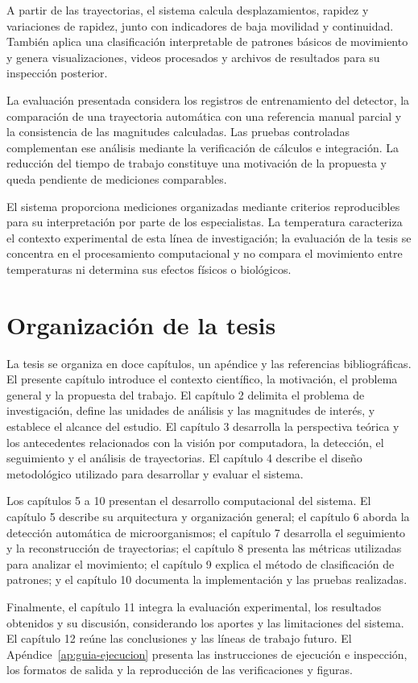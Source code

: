 A partir de las trayectorias, el sistema calcula desplazamientos, rapidez y variaciones de rapidez, junto con indicadores de baja movilidad y continuidad. También aplica una clasificación interpretable de patrones básicos de movimiento y genera visualizaciones, videos procesados y archivos de resultados para su inspección posterior.

La evaluación presentada considera los registros de entrenamiento del detector, la comparación de una trayectoria automática con una referencia manual parcial y la consistencia de las magnitudes calculadas. Las pruebas controladas complementan ese análisis mediante la verificación de cálculos e integración. La reducción del tiempo de trabajo constituye una motivación de la propuesta y queda pendiente de mediciones comparables.

El sistema proporciona mediciones organizadas mediante criterios reproducibles para su interpretación por parte de los especialistas. La temperatura caracteriza el contexto experimental de esta línea de investigación; la evaluación de la tesis se concentra en el procesamiento computacional y no compara el movimiento entre temperaturas ni determina sus efectos físicos o biológicos.

\section{Organización de la tesis}

La tesis se organiza en doce capítulos, un apéndice y las referencias bibliográficas. El presente capítulo introduce el contexto científico, la motivación, el problema general y la propuesta del trabajo. El capítulo 2 delimita el problema de investigación, define las unidades de análisis y las magnitudes de interés, y establece el alcance del estudio. El capítulo 3 desarrolla la perspectiva teórica y los antecedentes relacionados con la visión por computadora, la detección, el seguimiento y el análisis de trayectorias. El capítulo 4 describe el diseño metodológico utilizado para desarrollar y evaluar el sistema.

Los capítulos 5 a 10 presentan el desarrollo computacional del sistema. El capítulo 5 describe su arquitectura y organización general; el capítulo 6 aborda la detección automática de microorganismos; el capítulo 7 desarrolla el seguimiento y la reconstrucción de trayectorias; el capítulo 8 presenta las métricas utilizadas para analizar el movimiento; el capítulo 9 explica el método de clasificación de patrones; y el capítulo 10 documenta la implementación y las pruebas realizadas.

Finalmente, el capítulo 11 integra la evaluación experimental, los resultados obtenidos y su discusión, considerando los aportes y las limitaciones del sistema. El capítulo 12 reúne las conclusiones y las líneas de trabajo futuro. El Apéndice~\ref{ap:guia-ejecucion} presenta las instrucciones de ejecución e inspección, los formatos de salida y la reproducción de las verificaciones y figuras.

